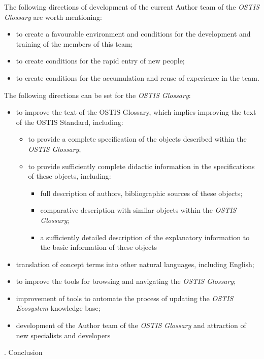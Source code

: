 \documentclass[10pt,a4paper]{article}
\newcommand{\RomanNumeralCaps}[1]
    {\MakeUppercase{\romannumeral #1}}
\begin{document}
\begin{multicols}{2}
The following directions of development of the current
Author team of the \textit{OSTIS Glossary} are worth mentioning:
\begin{itemize}
    \item to create a favourable environment and conditions for the development and training of the members of this team;
    \item to create conditions for the rapid entry of new people;
    \item to create conditions for the accumulation and reuse of experience in the team.
\end{itemize}


The following directions can be set for the \textit{OSTIS Glossary}:
\begin{itemize}
    \item to improve the text of the OSTIS Glossary, which implies improving the text of the OSTIS Standard, including:
    \begin{itemize}
        \item to provide a complete specification of the objects described within the\textit{ OSTIS Glossary};
        \item to provide sufficiently complete didactic information in the specifications of these objects, including:
        \begin{itemize}
            \item full description of authors, bibliographic sources of these objects;
            \item comparative description with similar objects within the \textit{OSTIS Glossary};
            \item a sufficiently detailed description of the explanatory information to the basic information of these objects
        \end{itemize}
    \end{itemize}
    \item translation of concept terms into other natural languages, including English;
    \item to improve the tools for browsing and navigating the \textit{OSTIS Glossary};
    \item improvement of tools to automate the process of updating the \textit{OSTIS Ecosystem} knowledge base;
    \item development of the Author team of the \textit{OSTIS Glossary} and attraction of new specialists and developers
\end{itemize}
\begin{center}
    \RomanNumeralCaps{5}. Conclusion
\end{center}


\end{multicols}
\end{document}
